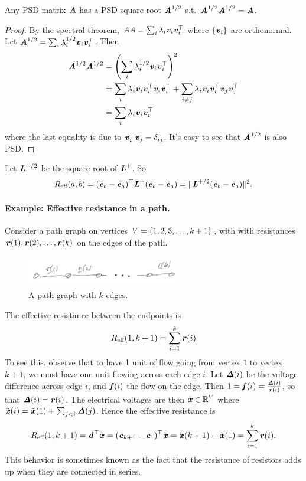 \begin{claim}
	Any PSD matrix $\AA$ has a PSD square root $\AA^{1/2}$ s.t.\ $\AA^{1/2}\AA^{1/2}=\AA$.
\end{claim}
\begin{proof}
	By the spectral theorem, $AA = \sum_i \lambda_i\vv_i\vv_i^\trp$ where $\{\vv_i\}$ are orthonormal. Let $\AA^{1/2} = \sum_i \lambda_i^{1/2}\vv_i\vv_i^\trp$. Then
	\begin{align*}
		\AA^{1/2}\AA^{1/2}
		&= \left(\sum_i \lambda_i^{1/2}\vv_i\vv_i^\trp\right)^2 \\
		&= \sum_{i}\lambda_i \vv_i\vv_i^\trp\vv_i\vv_i^\trp + \sum_{i\neq j}\lambda_i \vv_i\vv_i^\trp\vv_j\vv_j^\trp \\
		&= \sum_i \lambda_i\vv_i\vv_i^\trp \\
	\end{align*}
	where the last equality is due to $\vv_i^\trp\vv_j = \delta_{ij}$. It's easy to see that $\AA^{1/2}$ is also PSD.
\end{proof}

Let $\LL^{+/2}$ be the square root of $\LL^{+}$. So
\[ \er(a,b) = (\ee_b-\ee_a)^\trp\LL^{\pinv}(\ee_b-\ee_a) = \|\LL^{+/2}(\ee_b-\ee_a)\|^2. \]

\paragraph{Example: Effective resistance in a path.}
Consider a path graph on vertices $V = \setof{1,2,3,\ldots, k+1}$,
with with resistances $\rr(1), \rr(2), \ldots, \rr(k)$ on
the edges of the path.
\begin{figure}[H]
  \centering
  \includegraphics[width=0.6\textwidth]{fig/lecture6_seriesres.jpeg}
  \caption{A path graph with $k$ edges.}
\label{fig:seriesres}
\end{figure}
The effective resistance between the
endpoints is
\[
  \er(1,k+1) = \sum_{i = 1}^{k} \rr(i)
  \]
To see this, observe that to have 1 unit of flow going from vertex $1$ to vertex $k+1$, we must
have one unit flowing across each edge $i$.
Let $\DDelta(i)$ be the voltage difference across edge $i$, and $\ff(i)$ the
flow on the edge.
Then $1 = \ff(i) = \frac{\DDelta(i)}{\rr(i)}$, so that $\DDelta(i) =
\rr(i)$.
The electrical voltages are then $\xxtil \in \R^V$ where $\xxtil(i) =
\xxtil(1) + \sum_{j < i} \DDelta(j)$.
Hence the effective resistance is
\[\er(1,k+1) = \dd^{\trp}\xxtil=  (\ee_{k+1}-\ee_{1})^{\trp}\xxtil = \xxtil(k+1) -
  \xxtil(1) = \sum_{i = 1}^{k} \rr(i)
.
\]
This behavior is sometimes known as the fact that the resistance of
resistors adds up when they are connected in series.

